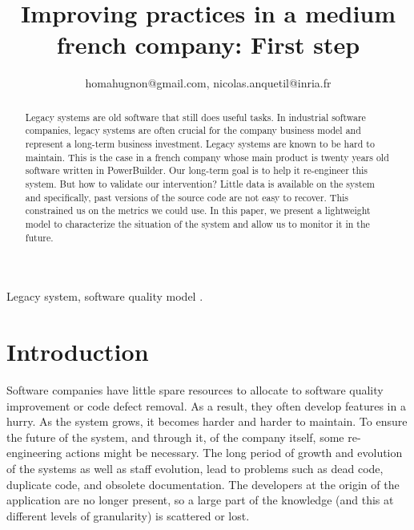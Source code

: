 \documentclass[10pt,conference]{IEEEtran}
\begin{document}
\title{Improving practices in a medium french  company: First step}

\author{
homahugnon@gmail.com, nicolas.anquetil@inria.fr}


\maketitle

\begin{abstract}
Legacy systems are old software that still does useful tasks.
In industrial software companies, legacy systems are often crucial for the company business model and represent a long-term business investment.
Legacy systems are known to be hard to maintain.
This is the case in a french company whose main product is twenty years old software written in PowerBuilder.
Our long-term goal is to help it re-engineer this system.
But how to validate our intervention?
Little data is available on the system and specifically, past versions of the source code are not easy to recover.
This constrained us on the metrics we could use.
In this paper, we present a lightweight model to characterize the situation of the system and allow us to monitor it in the future.
\end{abstract}

\begin{IEEEkeywords}
Legacy system, software quality model .
\end{IEEEkeywords}

\section{Introduction}

Software companies have little spare resources to allocate to software quality improvement or code defect removal.
As a result, they often develop features in a hurry.
As the system grows, it becomes harder and harder to maintain.
To ensure the future of the system, and through it, of the company itself, some re-engineering actions might be necessary.
The long period of growth and evolution of the systems as well as staff evolution, lead to problems such as dead code, duplicate code, and obsolete documentation. 
The developers at the origin of the application are no longer present, so a large part of the knowledge (and this at different levels of granularity) is scattered or lost. 
\end{document}

